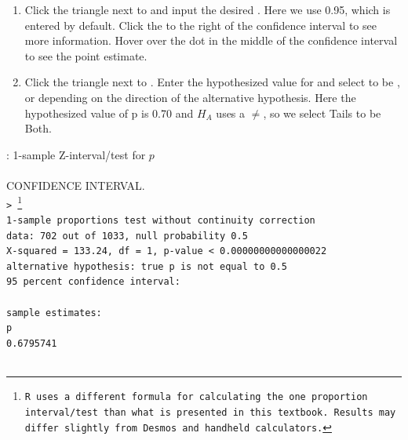 \begin{enumerate}
\indent\hspace{-4mm} * You can type  in place of steps 1-3 above.
\vspace{1mm}
\item Click the triangle next to  and input the desired .  Here we use 0.95, which is entered by default.  Click the \calctext{\vdots } to the right of the confidence interval to see more information.  Hover over the dot in the middle of the confidence interval to see the point estimate.  
\item Click the triangle next to .  Enter the hypothesized value for  and select  to be ,  or  depending on the direction of the alternative hypothesis.  Here the hypothesized value of p is 0.70 and $H_A$ uses a $\ne$, so we select Tails to be Both.  
\begin{center}
\hspace{5mm}
\end{center}
\end{enumerate}
\newpage
\noindent \R{}:  1-sample Z-interval/test for $p$\\
\\
\noindent CONFIDENCE INTERVAL.\\
\texttt{> \footnote{R uses a different formula for calculating the one proportion interval/test than what is presented in this textbook.  Results may differ slightly from Desmos and handheld calculators.}\\
	1-sample proportions test without continuity correction\\
data:  702 out of 1033, null probability 0.5\\
X-squared = 133.24, df = 1, p-value < 0.00000000000000022\\
alternative hypothesis: true p is not equal to 0.5\\
95 percent confidence interval:\\
\\
sample estimates:\\
        p \\
0.6795741\\ 
}\\ 

